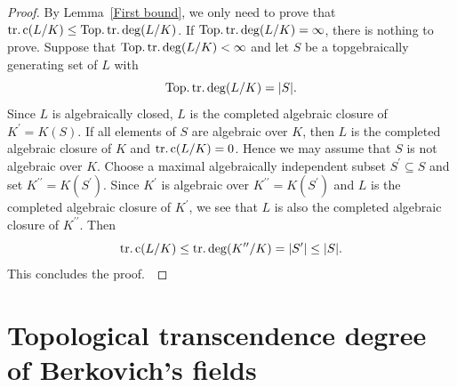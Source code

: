 \begin{proof}By Lemma~\ref{First bound}, we only need to prove that $\operatorname{tr.c}(L/K)\leq\operatorname{Top.tr.deg}(L/K)$. If $\operatorname{Top.tr.deg}(L/K)=\infty$, there is nothing to prove. Suppose that $\operatorname{Top.tr.deg}(L/K)<\infty$ and let $S$ be a topgebraically generating set of $L$ with \begin{equation*}\operatorname{Top.tr.deg}(L/K)=\vert S\vert.\end{equation*}Since $L$ is algebraically closed, $L$ is the completed algebraic closure of $K^{\prime}=K(S)$. If all elements of $S$ are algebraic over $K$, then $L$ is the completed algebraic closure of $K$ and $\operatorname{tr.c}(L/K)=0$. Hence we may assume that $S$ is not algebraic over $K$. Choose a maximal algebraically independent subset $S^{\prime}\subseteq S$ and set $K^{\prime\prime}=K(S^{\prime})$. Since $K^{\prime}$ is algebraic over $K^{\prime\prime}=K(S^{\prime})$ and $L$ is the completed algebraic closure of $K^{\prime}$, we see that $L$ is also the completed algebraic closure of $K^{\prime\prime}$. Then \begin{equation*}\operatorname{tr.c}(L/K)\leq \operatorname{tr.deg}(K^{\prime\prime}/K)=\vert S^{\prime}\vert\leq \vert S\vert.\end{equation*}This concludes the proof. \end{proof}


\section{Topological transcendence degree of Berkovich's fields}\label{sec:Berkovich's fields}

